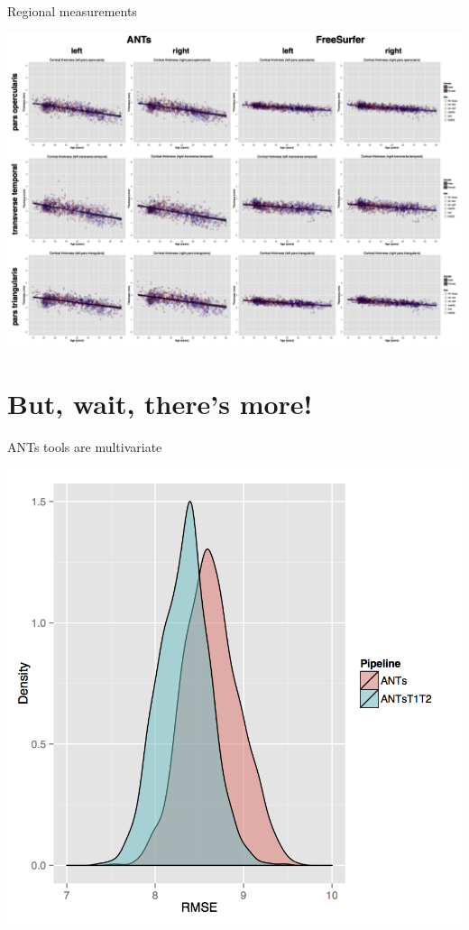 \documentclass[ignorenonframetext,]{beamer}
\begin{document}
\begin{frame}{Regional measurements}

\includegraphics{./evaluation/figures/antsvfreesurfer_regionalPlots.png}

\end{frame}

\section{But, wait, there's more!}\label{but-wait-theres-more}

\begin{frame}{ANTs tools are multivariate}

\includegraphics{./evaluation/figures/rfRmse05ANTsT1T2.png}

\end{frame}
\end{document}
